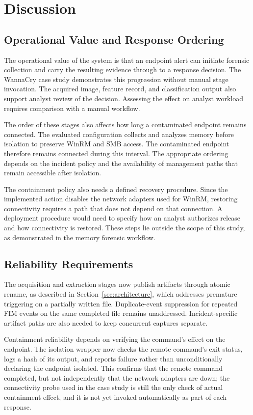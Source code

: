 \documentclass[conference]{IEEEtran}
\begin{document}
\section{Discussion}
\label{sec:discussion}

\subsection{Operational Value and Response Ordering}
The operational value of the system is that an endpoint alert can initiate forensic collection and carry the resulting evidence through to a response decision. The WannaCry case study demonstrates this progression without manual stage invocation. The acquired image, feature record, and classification output also support analyst review of the decision. Assessing the effect on analyst workload requires comparison with a manual workflow.

The order of these stages also affects how long a contaminated endpoint remains connected. The evaluated configuration collects and analyzes memory before isolation to preserve WinRM and SMB access. The contaminated endpoint therefore remains connected during this interval. The appropriate ordering depends on the incident policy and the availability of management paths that remain accessible after isolation.

The containment policy also needs a defined recovery procedure. Since the implemented action disables the network adapters used for WinRM, restoring connectivity requires a path that does not depend on that connection. A deployment procedure would need to specify how an analyst authorizes release and how connectivity is restored. These steps lie outside the scope of this study, as demonstrated in the memory forensic workflow.

\subsection{Reliability Requirements}
The acquisition and extraction stages now publish artifacts through atomic rename, as described in Section~\ref{sec:architecture}, which addresses premature triggering on a partially written file. Duplicate-event suppression for repeated FIM events on the same completed file remains unaddressed. Incident-specific artifact paths are also needed to keep concurrent captures separate.

Containment reliability depends on verifying the command's effect on the endpoint. The isolation wrapper now checks the remote command's exit status, logs a hash of its output, and reports failure rather than unconditionally declaring the endpoint isolated. This confirms that the remote command completed, but not independently that the network adapters are down; the connectivity probe used in the case study is still the only check of actual containment effect, and it is not yet invoked automatically as part of each response.
\end{document}
